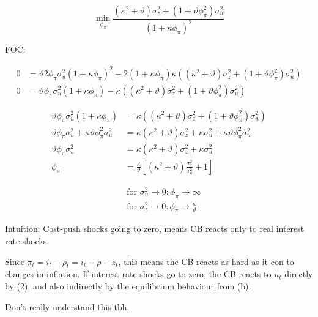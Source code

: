 {\begin{enumerate}[label=(\alph*)]
{$$
\min _{\phi_{\pi}} \frac{\left(\kappa^{2}+\vartheta\right) \sigma_{z}^{2}+\left(1+\vartheta \phi_{\pi}^{2}\right) \sigma_{u}^{2}}{\left(1+\kappa \phi_{\pi}\right)^{2}}
$$

FOC:

\begin{align*}
    0 &= \vartheta 2 \phi_{\pi} \sigma_{u}^{2}\left(1+\kappa \phi_{\pi}\right)^{2} -2\left(1+\kappa \phi_{\pi}\right) \kappa\left(\left(\kappa^{2}+\vartheta\right) \sigma_{z}^{2}+\left(1+\vartheta \phi_{\pi}^{2}\right) \sigma_{u}^{2}\right) \\
    0 &= \vartheta  \phi_{\pi} \sigma_{u}^{2}\left(1+\kappa \phi_{\pi}\right) -\kappa\left(\left(\kappa^{2}+\vartheta\right) \sigma_{z}^{2}+\left(1+\vartheta \phi_{\pi}^{2}\right) \sigma_{u}^{2}\right)
\end{align*}

\begin{align*}
    \vartheta  \phi_{\pi} \sigma_{u}^{2}\left(1+\kappa \phi_{\pi}\right) &= \kappa\left(\left(\kappa^{2}+\vartheta\right) \sigma_{z}^{2}+\left(1+\vartheta \phi_{\pi}^{2}\right) \sigma_{u}^{2}\right) \\
    \vartheta  \phi_{\pi} \sigma_{u}^{2}+\kappa \vartheta  \phi_{\pi}^2 \sigma_{u}^{2} &=  \kappa\left(\kappa^{2}+\vartheta\right) \sigma_{z}^{2}+\kappa\sigma_{u}^{2}+\kappa\vartheta \phi_{\pi}^{2}\sigma_{u}^{2} \\
    \vartheta  \phi_{\pi} \sigma_{u}^{2} &=  \kappa\left(\kappa^{2}+\vartheta\right) \sigma_{z}^{2}+\kappa\sigma_{u}^{2} \\
    \phi_{\pi} &= \frac{\kappa}{\vartheta}\left[\left(\kappa^{2}+\vartheta\right) \frac{\sigma_{z}^{2}}{\sigma_u^{2}}+1\right]
\end{align*}

$$
\begin{aligned}
& \text { for } \sigma_{u}^{2} \longrightarrow 0: \phi_{\pi} \rightarrow \infty \\
& \text { for } \sigma_{z}^{2} \longrightarrow 0: \phi_{\pi} \longrightarrow \frac{\kappa}{\vartheta}
\end{aligned}
$$

Intuition: Cost-push shocks going to zero, means CB reacts only to real interest rate shocks.

Since $\pi_{t}=i_{t}-\rho_{t}=i_{t}-\rho-z_{t}$, this means the CB reacts as hard as it con to changes in inflation. If interest rate shocks go to zero, the CB reacts to $u_{t}$ directly by (2), and also indirectly by the equilibrium behaviour from (b).

\color{red}Don't really understand this tbh.\color{black}
}
\end{enumerate}
}